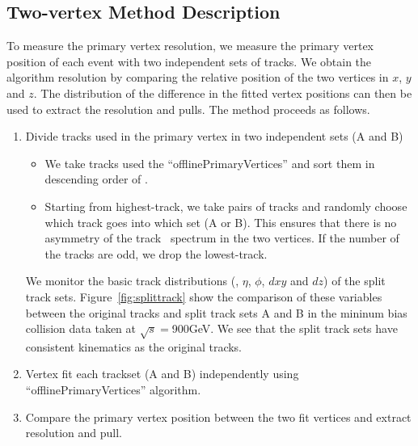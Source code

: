 \subsection{Two-vertex Method Description}

To measure the primary vertex resolution, we measure the primary vertex 
position of each event with two independent sets of tracks. 
We obtain the algorithm resolution by comparing the 
relative position of the two vertices in $x$, $y$ and $z$. 
The distribution of the difference in the fitted vertex positions 
can then be used to extract the resolution and pulls. 
The method proceeds as follows. 

\begin{enumerate}
\item Divide tracks used in the primary vertex in two independent sets (A and B)
\begin{itemize}
\item
We take tracks used the ``offlinePrimaryVertices'' and sort them in descending order of \pt. 
\item 
Starting from highest-\pt track, we take pairs of tracks and 
randomly choose which track goes into which set (A or B). This 
ensures that there is no asymmetry of the track \pt\, spectrum in 
the two vertices. If the number of the tracks are odd, we drop 
the lowest-\pt track. 
\end{itemize}
We monitor the basic track distributions (\pt, $\eta$, $\phi$, $dxy$ and $dz$) 
of the split track sets. Figure~\ref{fig:splittrack} show the comparison 
of these variables between the original tracks and split track sets A and B in 
the mininum bias collision data taken at $\sqrt{s}=$900GeV. 
We see that the split track sets have consistent kinematics as the 
original tracks. 

\item Vertex fit each trackset (A and B) independently using ``offlinePrimaryVertices'' algorithm.

\item Compare the primary vertex position between the two fit vertices and extract resolution and pull. 


\end{enumerate}
